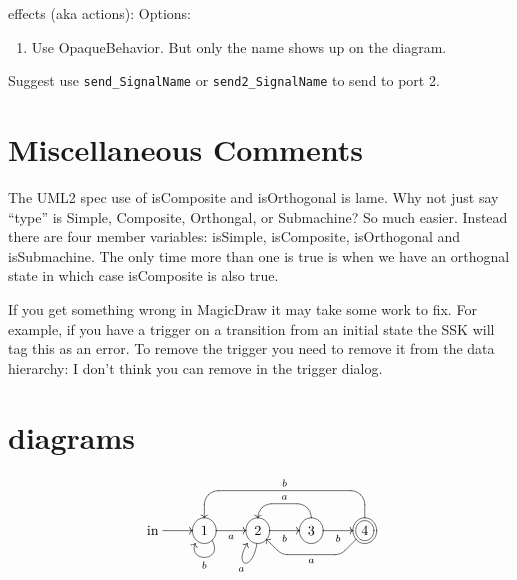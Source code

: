 \documentclass{article}
\begin{document}
effects (aka actions): Options:
\begin{enumerate}
\item
Use OpaqueBehavior.  But only the name shows up on the diagram.
\end{enumerate}

Suggest use \texttt{send\_SignalName} or \texttt{send2\_SignalName}
to send to port 2.


\section{Miscellaneous Comments}

The UML2 spec use of isComposite and isOrthogonal is lame.  Why not just
say ``type'' is Simple, Composite, Orthongal, or Submachine?  So much easier.
Instead there are four member variables: isSimple, isComposite, isOrthogonal
and isSubmachine.  The only time more than one is true is when we have an
orthognal state in which case isComposite is also true.

If you get something wrong in MagicDraw it may take some work to fix.  
For example, if you have a trigger on a transition from an initial state
the SSK will tag this as an error.  To remove the trigger you need to remove
it from the data hierarchy: I don't think you can remove in the trigger dialog.

\section{diagrams}

\begin{displaymath}
\UseTips
\entrymodifiers={++[o][F]}
\xymatrix @-1mm {
 *+\txt{in} \ar[r] 
& 1 \ar@(dr,dl)[]^b \ar[r]_a
& 2 \ar@(d,dl)[]^a \ar[r]_b
& 3 \ar `u[l] `^d[l]_a [l] \ar[r]_b
& *++[o][F=]{4}
    \ar `dl_l[ll]+/d6mm/`l_ul[ll]^a [ll]
    \ar `u^l[lll]+/u1cm/`l^d[lll]_b [lll]
}
\end{displaymath}
\end{document}
